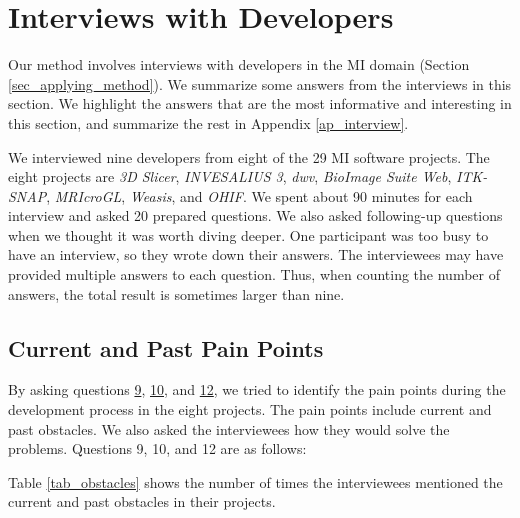 \chapter{Interviews with Developers}
\label{ch_interview}

Our method involves interviews with developers in the MI domain (Section \ref{sec_applying_method}). We summarize some answers from the interviews in this section. We highlight the answers that are the most informative and interesting in this section, and summarize the rest in Appendix \ref{ap_interview}.

We interviewed nine developers from eight of the 29 MI software projects. The eight projects are \textit{3D Slicer}, \textit{INVESALIUS 3}, \textit{dwv}, \textit{BioImage Suite Web}, \textit{ITK-SNAP}, \textit{MRIcroGL}, \textit{Weasis}, and \textit{OHIF}. We spent about 90 minutes for each interview and asked 20 prepared questions. We also asked following-up questions when we thought it was worth diving deeper. One participant was too busy to have an interview, so they wrote down their answers. The interviewees may have provided multiple answers to each question. Thus, when counting the number of answers, the total result is sometimes larger than nine.

\section{Current and Past Pain Points}
\label{sec_interview_pain_points}

By asking questions \hyperlink{q9}{9}, \hyperlink{q10}{10}, and \hyperlink{q12}{12}, we tried to identify the pain points during the development process in the eight projects. The pain points include current and past obstacles. We also asked the interviewees how they would solve the problems. Questions 9, 10, and 12 are as follows:


Table \ref{tab_obstacles} shows the number of times the interviewees mentioned the current and past obstacles in their projects.

